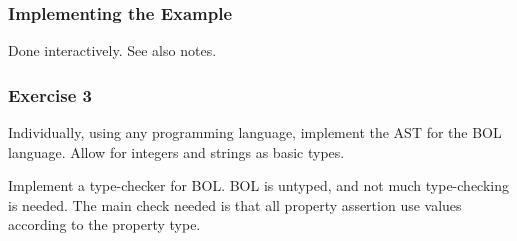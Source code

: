 \begin{frame}\frametitle{Implementing the Example}
Done interactively. See also notes.
\end{frame}


\begin{frame}\frametitle{Exercise 3}
Individually, using any programming language, implement the AST for the BOL language.
Allow for integers and strings as basic types.

Implement a type-checker for BOL.
BOL is untyped, and not much type-checking is needed.
The main check needed is that all property assertion use values according to the property type.
\end{frame}
